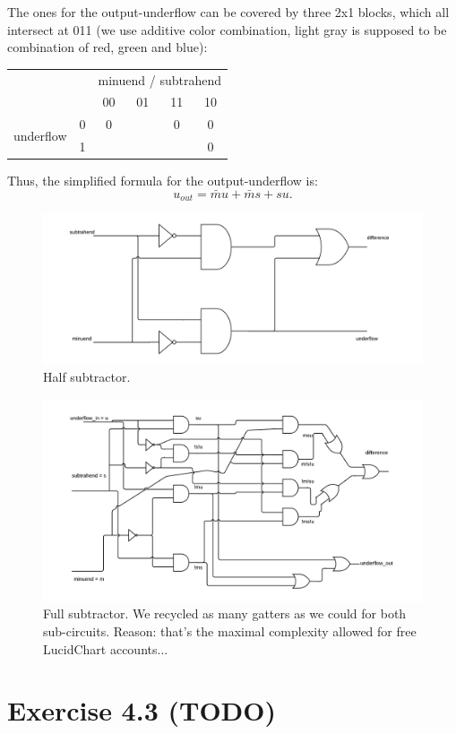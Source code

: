 \documentclass[10pt,a4paper]{scrartcl}
\newcommand{\subExercise}[1]{\vspace{0.5em} \noindent{\bf #1)}}
\begin{document}
The ones for the output-underflow can be covered by
three 2x1 blocks, which all intersect at 011 (we use additive color combination,
light gray is supposed to be combination of red, green and blue):
\vspace{0.5em}
\begin{tabular}{|c c|c c c c|}
  \hline 
    & & \multicolumn{4}{c|}{minuend / subtrahend} \\
    & & 00 & 01 & 11 & 10 \\
  \hline
    \multirow{2}{*}{underflow} & 0 & 0 & \cellcolor{green}{1} & 0 & 0 \\
                               & 1 & \cellcolor{red}{1} & \cellcolor{lightgray}{1} & \cellcolor{blue}{1} & 0 \\
  \hline
\end{tabular}

Thus, the simplified formula for the output-underflow is:
\[
u_{out} = \bar m u + \bar m s + su.
\]

\subExercise{d}

\vspace{1em}
\begin{figure}[h]
  \centering\includegraphics[width=\linewidth]{images/halfSubtractor.png}
  \caption{Half subtractor.}
\end{figure}
\vspace{1em}

\vspace{1em}
\begin{figure}[h]
  \centering\includegraphics[width=\linewidth]{images/fullSubtractor.png}
  \caption{Full subtractor. We recycled as many gatters as we could for both sub-circuits. Reason: that's the maximal complexity allowed for free LucidChart accounts...}
\end{figure}
\vspace{1em}

\FloatBarrier
\section*{Exercise 4.3 (TODO)}
\subExercise{a}
\subExercise{b}
\end{document}
